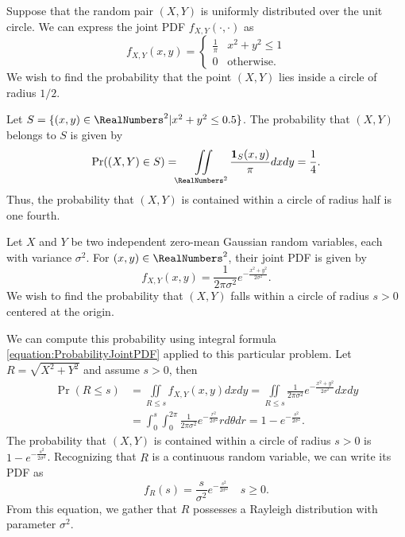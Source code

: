 \begin{example}
Suppose that the random pair $(X, Y)$ is uniformly distributed over the unit circle.
We can express the joint PDF $f_{X,Y} (\cdot, \cdot)$ as
\begin{equation*}
f_{X,Y} (x, y) = \begin{cases} \frac{1}{\pi} & x^2 + y^2 \leq 1 \\
0 & \text{otherwise} . \end{cases}
\end{equation*}
We wish to find the probability that the point $(X, Y)$ lies inside a circle of radius $1/2$.

Let $S = \{ (x, y) \in \RealNumbers^2 | x^2 + y^2 \leq 0.5 \}$.
The probability that $(X, Y)$ belongs to $S$ is given by
\begin{equation*}
\Pr ((X,Y) \in S)
= \iint\limits_{\RealNumbers^2}
\frac{\mathbf{1}_{S}(x, y)}{\pi} dx dy
= \frac{1}{4} .
\end{equation*}
Thus, the probability that $(X,Y)$ is contained within a circle of radius half is one fourth.
\end{example}

\begin{example}
Let $X$ and $Y$ be two independent zero-mean Gaussian random variables, each with variance $\sigma^2$.
For $(x, y) \in \RealNumbers^2$, their joint PDF is given by
\begin{equation*}
f_{X,Y} (x,y) = \frac{1}{2 \pi \sigma^2} e^{- \frac{x^2 + y^2}{2 \sigma^2} } .
\end{equation*}
We wish to find the probability that $(X,Y)$ falls within a circle of radius $s > 0$ centered at the origin.

We can compute this probability using integral formula \eqref{equation:ProbabilityJointPDF} applied to this particular problem.
Let $R = \sqrt{X^2 + Y^2}$ and assume $s > 0$, then
\begin{equation*}
\begin{split}
\Pr (R \leq s) &= \iint\limits_{R \leq s} f_{X,Y} (x,y) dx dy
= \iint\limits_{R \leq s} \frac{1}{2 \pi \sigma^2}
e^{- \frac{ x^2 + y^2 }{2 \sigma^2} } dx dy \\
&= \int_0^s \int_0^{2\pi} \frac{1}{2 \pi \sigma^2}
e^{- \frac{ r^2 }{2 \sigma^2} } r d\theta dr
= 1 - e^{- \frac{ s^2 }{2 \sigma^2} } .
\end{split}
\end{equation*}
The probability that $(X, Y)$ is contained within a circle of radius $s>0$ is $1 - e^{- \frac{ s^2 }{2 \sigma^2} }$.
Recognizing that $R$ is a continuous random variable, we can write its PDF as
\begin{equation*}
f_R (s) = \frac{s}{\sigma^2} e^{- \frac{s^2}{2 \sigma^2} } \quad s \geq 0 .
\end{equation*}
From this equation, we gather that $R$ possesses a Rayleigh distribution with parameter $\sigma^2$.
\end{example}


